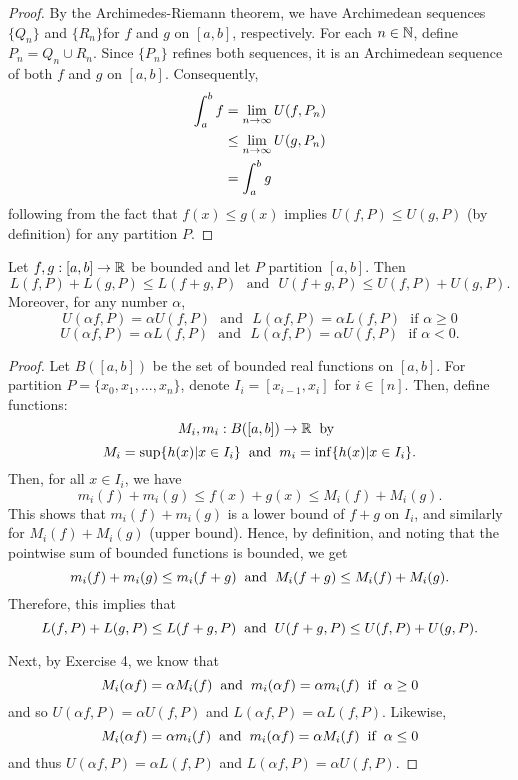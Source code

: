 \documentclass[letterpaper, twoside, 12pt]{book}
\begin{document}
\begin{proof}
    By the Archimedes-Riemann theorem, we have Archimedean sequences 
    \(\{Q_n\}\) and \(\{R_n\}\)for \(f\) and \(g\) on \([a,b]\), respectively. 
    For each \(n \in \mathbb N\), define \(P_n = Q_n \cup R_n\). Since \(\{P_n\}\)
    refines both sequences, it is an Archimedean sequence of both \(f\) and \(g\)
    on \([a,b]\). Consequently,
    \begin{align*}
        \int_a^b f &= \lim_{n \to \infty} U(f, P_n) \\
                   &\leq \lim_{n \to \infty} U(g, P_n) \\
                   &= \int_a^b g \\
    \end{align*}
    following from the fact that \(f(x) \leq g(x)\) implies \(U(f, P) \leq U(g, P)\)
    (by definition) for any partition \(P\).
\end{proof}


\begin{lemma}[6.14]
  Let \(f,g:[a,b]\to\mathbb R\) be bounded and let \(P\) partition \([a,b]\).
  Then
  \[
    L(f,P)+L(g,P)\leq L(f+g,P)
      \text{~~and~~}
    U(f+g,P)\leq U(f,P)+U(g,P)
  .\]
  Moreover, for any number \(\alpha\),
  \[
    U(\alpha f,P)=\alpha U(f,P)
      \text{~~and~~}
    L(\alpha f,P)=\alpha L(f,P)
      \text{~~if~}
    \alpha\geq 0
  \]
  \[
    U(\alpha f,P)=\alpha L(f,P)
      \text{~~and~~}
    L(\alpha f,P)=\alpha U(f,P)
      \text{~~if~}
    \alpha< 0
  .\]
\end{lemma}

\begin{proof}
    Let \(B([a,b])\) be the set of bounded real functions on \([a,b]\).
    For partition \(P = \{x_0, x_1, ..., x_n\}\), denote \(I_i = [x_{i-1}, x_i]\) 
    for \(i \in [n]\). Then, define functions: 
    \[M_i, m_i : B([a,b]) \rightarrow \mathbb R \hspace{2mm} \text{by} \hspace{2mm}\]
    \[M_i = \sup \{ h(x) | x \in I_i \} \hspace{2mm} \text{and} \hspace{2mm} m_i = \inf \{ h(x) | x \in I_i \} . \]
    Then, for all \(x \in I_i\), we have
    \[ m_i(f) + m_i(g) \leq f(x) + g(x) \leq M_i(f) + M_i(g) .\]
    This shows that \(m_i(f) + m_i(g)\) is a lower bound of \(f + g\) on \(I_i\),
    and similarly for \(M_i(f) + M_i(g)\) (upper bound). Hence, by definition, and
    noting that the pointwise sum of bounded functions is bounded, we get
    \[ m_i(f) + m_i(g) \leq m_i(f + g) \hspace{2mm} \text{and} \hspace{2mm} M_i(f + g) \leq M_i(f) + M_i(g) .\]
    Therefore, this implies that 
    \[ L(f, P) + L(g, P) \leq L(f+g, P) \hspace{2mm} \text{and} \hspace{2mm} U(f + g, P) \leq U(f, P) + U(g, P) .\]

   Next, by Exercise 4, we know that 
   \[ M_i(\alpha f) = \alpha M_i(f) \hspace{2mm} \text{and} \hspace{2mm} m_i(\alpha f) = \alpha m_i(f) \hspace{2mm} \text{if} \hspace{2mm} \alpha \geq 0 \]
   and so \(U(\alpha f, P) = \alpha U(f, P)\) and \(L(\alpha f, P) = \alpha L(f, P) \).
   Likewise,
   \[ M_i(\alpha f) = \alpha m_i(f) \hspace{2mm} \text{and} \hspace{2mm} m_i(\alpha f) = \alpha M_i(f) \hspace{2mm} \text{if} \hspace{2mm} \alpha \leq 0 \]
   and thus \(U(\alpha f, P) = \alpha L(f, P)\) and \(L(\alpha f, P) = \alpha U(f, P) \).
\end{proof}
\end{document}
